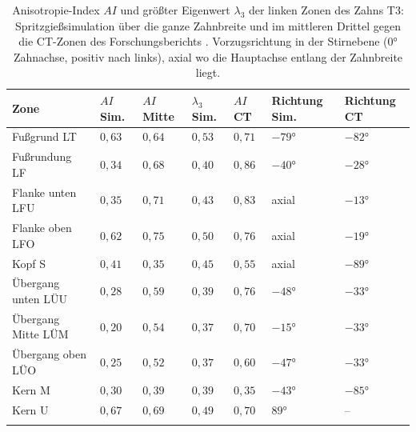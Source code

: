 \begin{table}[htbp]
    \caption{Anisotropie-Index $AI$ und größter Eigenwert $\lambda_{3}$ der linken Zonen des Zahns T3: Spritzgießsimulation über die ganze Zahnbreite und im mittleren Drittel gegen die CT-Zonen des Forschungsberichts \cite[Bild~17 und 23, S.~19 und 24]{FVA856-I}. Vorzugsrichtung in der Stirnebene ($0$° Zahnachse, positiv nach links), \glqq axial\grqq{} wo die Hauptachse entlang der Zahnbreite liegt.}
    \label{tab:faserorientierung_zonen}
    \centering
    \footnotesize
    \begin{tabular}{L{3.4cm}L{1.3cm}L{1.3cm}L{1.6cm}L{1.3cm}L{2.0cm}L{2.0cm}}
        Zone               & $AI$ Sim. & $AI$ Mitte & $\lambda_{3}$ Sim. & $AI$ CT  & Richtung Sim. & Richtung CT \\
        \hline
        Fußgrund LT        & $0{,}63$  & $0{,}64$   & $0{,}53$           & $0{,}71$ & $-79$°        & $-82$°      \\
        \hline
        Fußrundung LF      & $0{,}34$  & $0{,}68$   & $0{,}40$           & $0{,}86$ & $-40$°        & $-28$°      \\
        \hline
        Flanke unten LFU   & $0{,}35$  & $0{,}71$   & $0{,}43$           & $0{,}83$ & axial         & $-13$°      \\
        \hline
        Flanke oben LFO    & $0{,}62$  & $0{,}75$   & $0{,}50$           & $0{,}76$ & axial         & $-19$°      \\
        \hline
        Kopf S             & $0{,}41$  & $0{,}35$   & $0{,}45$           & $0{,}55$ & axial         & $-89$°      \\
        \hline
        Übergang unten LÜU & $0{,}28$  & $0{,}59$   & $0{,}39$           & $0{,}76$ & $-48$°        & $-33$°      \\
        \hline
        Übergang Mitte LÜM & $0{,}20$  & $0{,}54$   & $0{,}37$           & $0{,}70$ & $-15$°        & $-33$°      \\
        \hline
        Übergang oben LÜO  & $0{,}25$  & $0{,}52$   & $0{,}37$           & $0{,}60$ & $-47$°        & $-33$°      \\
        \hline
        Kern M             & $0{,}30$  & $0{,}39$   & $0{,}39$           & $0{,}35$ & $-43$°        & $-85$°      \\
        \hline
        Kern U             & $0{,}67$  & $0{,}69$   & $0{,}49$           & $0{,}70$ & $89$°         & --          \\
        \hline
    \end{tabular}
\end{table}

